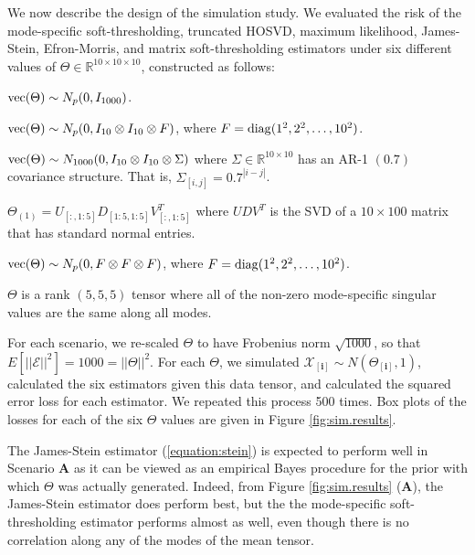 We now describe the design of the simulation study. We evaluated the risk of the mode-specific soft-thresholding, truncated HOSVD, maximum likelihood, James-Stein, Efron-Morris, and matrix soft-thresholding estimators under six different values of $\Theta \in \mathbb{R}^{10 \times 10 \times 10}$, constructed as follows:
\begin{description}[noitemsep]
\item[A.] $\operatorname*{vec}(\Theta) \sim N_p(0,I_{1000})$.
\item[B.] $\operatorname*{vec}(\Theta) \sim N_p(0,I_{10} \otimes I_{10} \otimes F)$, where $F =
  \operatorname*{diag}(1^2,2^2,\ldots,10^2)$.
\item[C.] $\operatorname*{vec}(\Theta) \sim N_{1000}(0,I_{10}\otimes I_{10}\otimes \Sigma)$ where
  $\Sigma \in \mathbb{R}^{10\times 10}$ has an AR-1 $(0.7)$ covariance structure. That is,
  $\Sigma_{[i,j]} = 0.7^{|i - j|}$.
\item[D.] $\Theta_{(1)} = U_{[:,1:5]}D_{[1:5,1:5]}V_{[:,1:5]}^T$ where
    $UDV^T$ is the SVD of a $10 \times 100$ matrix that has standard
    normal entries.
\item[E.] $\operatorname*{vec}(\Theta) \sim N_p(0,F \otimes F \otimes F)$, where $F =
  \operatorname*{diag}(1^2,2^2,\ldots,10^2)$.
\item[F.] $\Theta$ is a rank $(5,5,5)$ tensor where all of the non-zero mode-specific
  singular values are the same along all modes. 
\end{description}
For each scenario, we re-scaled $\Theta$ to have Frobenius norm
$\sqrt{1000}$, so that $E[||\mathcal{E}||^2] = 1000 = ||\Theta||^2$. For
each $\Theta$, we simulated $\mathcal{X}_{[\mathbf{i}]} \sim
N(\Theta_{[\mathbf{i}]},1)$, calculated the six estimators given
this data tensor, and calculated the squared error loss for each estimator. We repeated this process 500 times. Box plots of the losses for each of the six $\Theta$ values are given in Figure \ref{fig:sim.results}.

The James-Stein estimator
(\ref{equation:stein}) is expected to perform well in Scenario \textbf{A} as it can be viewed as an empirical Bayes procedure for the prior with which $\Theta$ was actually generated.
Indeed, from Figure \ref{fig:sim.results} (\textbf{A}), the
James-Stein estimator does perform best, but the the mode-specific
soft-thresholding estimator performs almost as well, even though there
is no correlation along any of the modes of the mean tensor.

